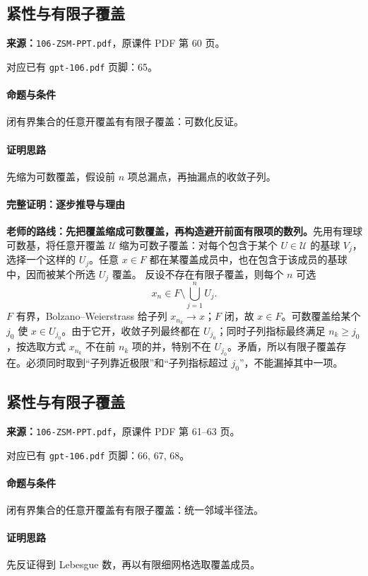 \clearpage\subsection{紧性与有限子覆盖}
\textbf{来源：}\texttt{106-ZSM-PPT.pdf}，原课件 PDF 第 60 页。\par
对应已有 \texttt{gpt-106.pdf} 页脚：65。\par
\paragraph{命题与条件}闭有界集合的任意开覆盖有有限子覆盖：可数化反证。
\paragraph{证明思路}先缩为可数覆盖，假设前 $n$ 项总漏点，再抽漏点的收敛子列。
\paragraph{完整证明：逐步推导与理由}
\textbf{老师的路线：先把覆盖缩成可数覆盖，再构造避开前面有限项的数列。}先用有理球可数基，将任意开覆盖 $\mathcal U$ 缩为可数子覆盖：对每个包含于某个 $U\in\mathcal U$ 的基球 $V_j$，选择一个这样的 $U_j$。任意 $x\in F$ 都在某覆盖成员中，也在包含于该成员的基球中，因而被某个所选 $U_j$ 覆盖。
反设不存在有限子覆盖，则每个 $n$ 可选
\[x_n\in F\setminus\bigcup_{j=1}^nU_j.\]
$F$ 有界，Bolzano--Weierstrass 给子列 $x_{n_k}\to x$；$F$ 闭，故 $x\in F$。可数覆盖给某个 $j_0$ 使 $x\in U_{j_0}$。由于它开，收敛子列最终都在 $U_{j_0}$；同时子列指标最终满足 $n_k\ge j_0$，按选取方式 $x_{n_k}$ 不在前 $n_k$ 项的并，特别不在 $U_{j_0}$。矛盾，所以有限子覆盖存在。必须同时取到“子列靠近极限”和“子列指标超过 $j_0$”，不能漏掉其中一项。
\clearpage\subsection{紧性与有限子覆盖}
\textbf{来源：}\texttt{106-ZSM-PPT.pdf}，原课件 PDF 第 61--63 页。\par
对应已有 \texttt{gpt-106.pdf} 页脚：66, 67, 68。\par
\paragraph{命题与条件}闭有界集合的任意开覆盖有有限子覆盖：统一邻域半径法。
\paragraph{证明思路}先反证得到 Lebesgue 数，再以有限细网格选取覆盖成员。
